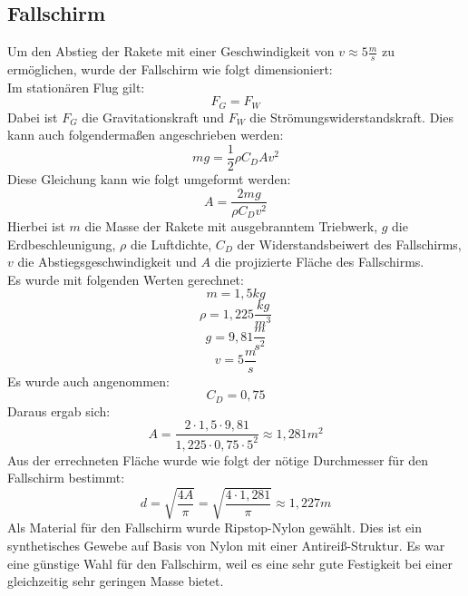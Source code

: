 \subsection{Fallschirm}
\label{subsec:parachute}
Um den Abstieg der Rakete mit einer Geschwindigkeit von $v \approx 5\frac{m}{s}$ zu ermöglichen, wurde der Fallschirm wie folgt dimensioniert:
\\
Im stationären Flug gilt:
\begin{equation}
    F_G = F_W
\end{equation}
Dabei ist $F_G$ die Gravitationskraft und $F_W$ die Strömungswiderstandskraft. Dies kann auch folgendermaßen angeschrieben werden:
\begin{equation}
    mg = \frac{1}{2}\rho C_DAv^2
\end{equation}
Diese Gleichung kann wie folgt umgeformt werden:
\begin{equation}
    A = \frac{2mg}{\rho C_Dv^2}
\end{equation}
Hierbei ist $m$ die Masse der Rakete mit ausgebranntem Triebwerk, $g$ die Erdbeschleunigung, $\rho$ die Luftdichte, $C_D$ der Widerstandsbeiwert des Fallschirms, $v$ die Abstiegsgeschwindigkeit und $A$ die projizierte Fläche des Fallschirms.
\\
Es wurde mit folgenden Werten gerechnet:
\[
    m = 1,5kg 
\]
\[
    \rho = 1,225\frac{kg}{m^3} 
\]
\[
    g = 9,81\frac{m}{s^2}
\]
\[
    v = 5\frac{m}{s}
\]
Es wurde auch angenommen:
\[
    C_D = 0,75
\]
Daraus ergab sich:
\begin{equation}
    A = \frac{2 \cdot 1,5 \cdot 9,81}{1,225 \cdot 0,75 \cdot 5^2} \approx 1,281m^2
\end{equation}
Aus der errechneten Fläche wurde wie folgt der nötige Durchmesser für den Fallschirm bestimmt:
\begin{equation}
    d = \sqrt{\frac{4A}{\pi}} = \sqrt{\frac{4 \cdot 1,281}{\pi}} \approx 1,227m
\end{equation}
Als Material für den Fallschirm wurde Ripstop-Nylon gewählt. Dies ist ein synthetisches Gewebe auf Basis von Nylon mit einer Antireiß-Struktur. Es war eine günstige Wahl für den Fallschirm, weil es eine sehr gute Festigkeit bei einer gleichzeitig sehr geringen Masse bietet.

